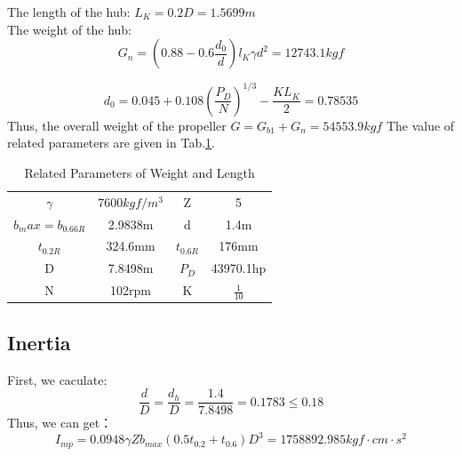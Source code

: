 \documentclass[a4paper,UTF8]{article}
\begin{document}
The length of the hub: $L_K=0.2D=1.5699m$\\
The weight of the hub:
\begin{equation}
G_n=\left(0.88-0.6\frac{d_0}{d}\right)l_K\gamma d^2=12743.1 kgf
\end{equation}

\begin{equation}
d_0=0.045+0.108\left(\frac{P_D}{N}\right)^{1/3}-\frac{KL_K}{2}=0.78535
\end{equation}
Thus, the overall weight of the propeller $G=G_{b1}+G_n=54553.9kgf$
The value of related parameters are given in Tab.\ref{tab:weightlength}.
\begin{table}[!htbp]
	\centering
	\begin{tabular}{cccc}
		\hline
		$\gamma$ & $7600kgf/m^3$ & Z & 5\\
		$b_max=b_{0.66R}$  & 2.9838m & d & 1.4m\\
		$t_{0.2R}$ & 324.6mm & $t_{0.6R}$ & 176mm\\
		D & 7.8498m & $P_D$ &43970.1hp \\
		N & 102rpm & K & $\frac{1}{10}$ \\
		\hline
	\end{tabular}
	\caption{Related Parameters of Weight and Length}
	\label{tab:weightlength}
\end{table}

\subsection{Inertia}
First, we caculate:
\begin{equation}
\frac{d}{D}=\frac{d_h}{D}=\frac{1.4}{7.8498}=0.1783 \leq 0.18
\end{equation}
Thus, we can get：\\
\begin{equation}
I_{mp}=0.0948\gamma Zb_{max}\left(0.5t_{0.2}+t_{0.6}\right)D^3=1758892.985kgf\cdot cm\cdot s^2
\end{equation}
\end{document}
